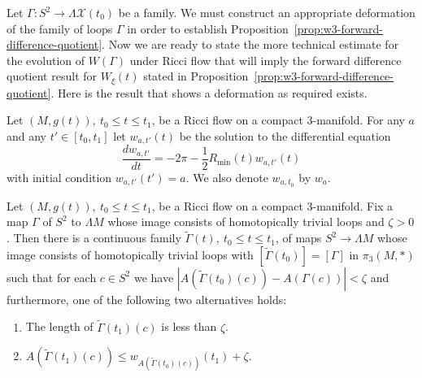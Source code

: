 Let $\Gamma\colon S^2\to \Lambda {\mathcal X}(t_0)$ be a family. We
must construct an appropriate deformation of the family of loops
$\Gamma$ in order to establish Proposition~\ref{prop:w3-forward-difference-quotient}. Now we
are ready to state the more technical estimate for the evolution of
$W(\Gamma)$ under Ricci flow that will imply the forward difference
quotient result for $W_\xi(t)$ stated in
Proposition~\ref{prop:w3-forward-difference-quotient}. Here is the result that shows a
deformation as required exists.

\begin{definition}
\label{def:w-a-t-ode-solution}
Let $(M,g(t)),\ t_0\le t\le t_1$, be a Ricci flow on a compact
$3$-manifold. For any $a$ and any $t'\in [t_0,t_1]$ let
$w_{a,t'}(t)$ be the solution to the differential equation
\begin{equation}\label{wdiffeqn}
\frac{dw_{a,t'}}{dt}=-2\pi-\frac{1}{2}R_{\min}(t)w_{a,t'}(t)
\end{equation}
with initial condition $w_{a,t'}(t')=a$. We also denote $w_{a,t_0}$
by $w_a$.
\end{definition}

\begin{proposition}
\label{prop:curve-deformation-existence}
\label{XI}
Let $(M,g(t)),\ t_0\le t\le t_1$, be a Ricci flow on a compact
$3$-manifold.  Fix a map $\Gamma$ of $S^2$ to $\Lambda M$
 whose image consists of homotopically trivial loops and $\zeta>0$. Then there
is a continuous family $\widetilde\Gamma(t),\ t_0\le t\le t_1$, of
maps $S^2\to \Lambda M$ whose image consists of homotopically
trivial loops with $[\widetilde\Gamma(t_0)]=[\Gamma]$ in
$\pi_3(M,*)$ such that for each $c\in S^2$ we have
$|A(\widetilde\Gamma(t_0)(c))-A(\Gamma(c))|<\zeta$ and furthermore,
one of the following two alternatives holds:
\begin{enumerate}
\item[(i)] The length of $\widetilde\Gamma(t_1)(c)$ is less than $\zeta$.
\item[(ii)] $A(\widetilde\Gamma(t_1)(c))\le w_{A(\widetilde\Gamma(t_0)(c))}(t_1)+\zeta$.
\end{enumerate}
\end{proposition}

